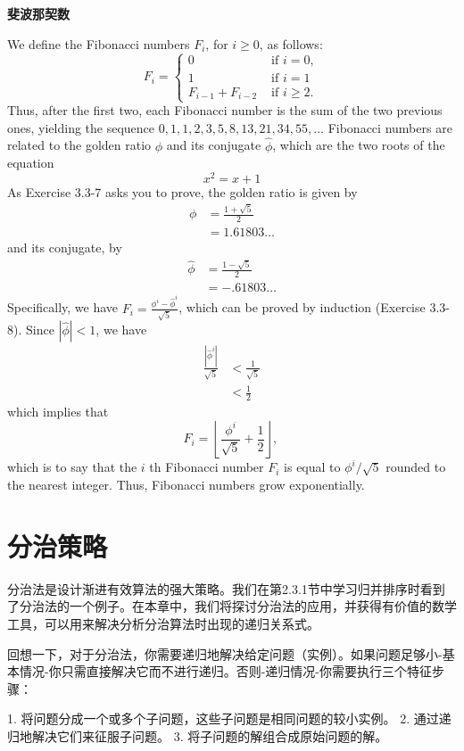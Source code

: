 \documentclass[lang=cn,newtx,10pt,scheme=chinese]{elegantbook}
\begin{document}
\textbf{斐波那契数}

We define the Fibonacci numbers $F_i$, for $i \geq 0$, as follows:
$$
F_i= \begin{cases}0 & \text { if } i=0, \\ 1 & \text { if } i=1 \\ F_{i-1}+F_{i-2} & \text { if } i \geq 2 .\end{cases}
$$
Thus, after the first two, each Fibonacci number is the sum of the two previous ones, yielding the sequence
$0,1,1,2,3,5,8,13,21,34,55, \ldots$
Fibonacci numbers are related to the golden ratio $\phi$ and its conjugate $\hat{\phi}$, which are the two roots of the equation
$$
x^2=x+1
$$
As Exercise 3.3-7 asks you to prove, the golden ratio is given by
$$
\begin{aligned}
\phi & =\frac{1+\sqrt{5}}{2} \\
& =1.61803 \ldots
\end{aligned}
$$
and its conjugate, by
$$
\begin{aligned}
\widehat{\phi} & =\frac{1-\sqrt{5}}{2} \\
& =-.61803 \ldots
\end{aligned}
$$
Specifically, we have
$F_i=\frac{\phi^i-\widehat{\phi}^i}{\sqrt{5}}$,
which can be proved by induction (Exercise 3.3-8). Since $|\hat{\phi}|<1$, we have
$$
\begin{aligned}
\frac{\left|\hat{\phi}^i\right|}{\sqrt{5}} & <\frac{1}{\sqrt{5}} \\
& <\frac{1}{2}
\end{aligned}
$$
which implies that
$$
F_i=\left\lfloor\frac{\phi^i}{\sqrt{5}}+\frac{1}{2}\right\rfloor \text {, }
$$
which is to say that the $i$ th Fibonacci number $F_i$ is equal to $\phi^i / \sqrt{5}$ rounded to the nearest integer. Thus, Fibonacci numbers grow exponentially.

\chapter{分治策略}

分治法是设计渐进有效算法的强大策略。我们在第2.3.1节中学习归并排序时看到了分治法的一个例子。在本章中，我们将探讨分治法的应用，并获得有价值的数学工具，可以用来解决分析分治算法时出现的递归关系式。

回想一下，对于分治法，你需要递归地解决给定问题（实例）。如果问题足够小-基本情况-你只需直接解决它而不进行递归。否则-递归情况-你需要执行三个特征步骤：

1. 将问题分成一个或多个子问题，这些子问题是相同问题的较小实例。
2. 通过递归地解决它们来征服子问题。
3. 将子问题的解组合成原始问题的解。
\end{document}
